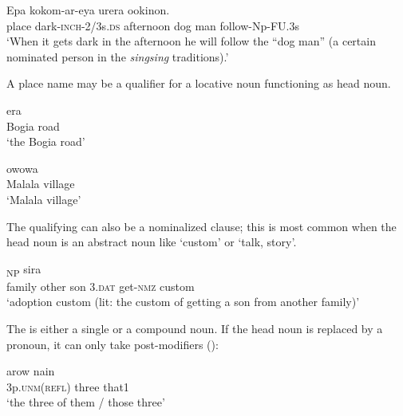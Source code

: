 \ea%
\label{ex:x1832}
\gll Epa  kokom-ar-eya  urera     ookinon. \\
    place  dark-\textsc{inch}-2/3s.\textsc{ds}  afternoon  dog  man  follow-Np-FU.3s  \\
\glt`When it gets dark in the afternoon he will follow the ``dog man'' (a certain nominated person in the \textit{singsing} traditions).'
\z





A place name may be a qualifier for a locative noun functioning as head noun. 

\ea%
\label{ex:x834}
\gll {}  era \\
     Bogia  road \\
\glt`the Bogia road'
\z





\ea%
\label{ex:x833}
\gll {}  owowa \\
  Malala  village    \\
\glt`Malala village'
\z





The qualifying  can also be a nominalized clause; this is most common when the head noun is an abstract noun like  `custom' or  `talk, story'.

\ea%
\label{ex:x414}
\textsubscript{NP}  sira \\
    family  other  son  3.\textsc{dat}  get-\textsc{nmz}  custom  \\
\glt`adoption custom (lit: the custom of getting a son from another family)'
\z





The  is either a single or a compound noun.  If the head noun is replaced by a pronoun, it can only take post-modifiers ():

\ea%
\label{ex:x415}
\gll {}  arow  nain  \\
   3p.\textsc{unm}(\textsc{refl})  three  that1   \\
\glt`the three of them / those three'
\z





